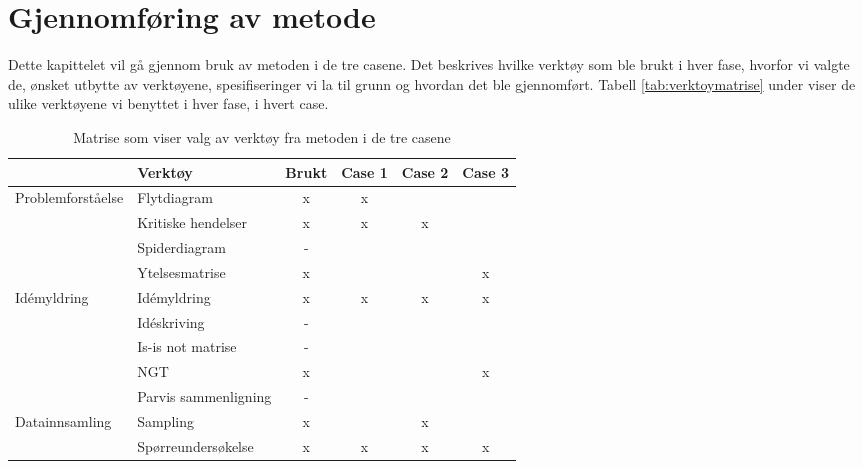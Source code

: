 \chapter{Gjennomføring av metode}
Dette kapittelet vil gå gjennom bruk av metoden i de tre casene. Det beskrives hvilke verktøy som ble brukt i hver fase, hvorfor vi valgte de, ønsket utbytte av verktøyene, spesifiseringer vi la til grunn og hvordan det ble gjennomført. Tabell \ref{tab:verktoymatrise} under viser de ulike verktøyene vi benyttet i hver fase, i hvert case. 
\begin{table}[htbp]
  \centering
    \caption[Matrise som viser valg av verktøy]{Matrise som viser valg av verktøy fra metoden i de tre casene}
    \begin{tabular}{|l|l|c|r|r|r|}
    \hline
         \cellcolor{yellow} & \cellcolor{yellow} Verktøy & \cellcolor{yellow} Brukt & \multicolumn{1}{c|}{\cellcolor{yellow} Case 1} & \multicolumn{1}{c|}{\cellcolor{yellow} Case 2} & \multicolumn{1}{c|}{\cellcolor{yellow} Case 3} \\
    \hline
    \multicolumn{1}{|l|}{\multirow{4}[8]{*}{Problemforståelse}} & Flytdiagram & x     & \multicolumn{1}{c|}{x} &       &  \\
\cline{2-6}          & Kritiske hendelser & x     & \multicolumn{1}{c|}{x} & \multicolumn{1}{c|}{x} &  \\
\cline{2-6}          & Spiderdiagram & -     &       &       &  \\
\cline{2-6}          & Ytelsesmatrise & x     &       &       & \multicolumn{1}{c|}{x} \\
    \hline
    \multicolumn{1}{|l|}{\multirow{5}[10]{*}{Idémyldring}} & Idémyldring & x     & \multicolumn{1}{c|}{x} & \multicolumn{1}{c|}{x} & \multicolumn{1}{c|}{x} \\
\cline{2-6}          & Idéskriving & -     &       &       &  \\
\cline{2-6}          & Is-is not matrise & -     &       &       &  \\
\cline{2-6}          & NGT   & x     &       &       & \multicolumn{1}{c|}{x} \\
\cline{2-6}          & Parvis sammenligning & -     &       &       &  \\
    \hline
    \multicolumn{1}{|l|}{\multirow{3}[6]{*}{Datainnsamling}} & Sampling & x     &    &  \multicolumn{1}{c|}{x}     &  \\
\cline{2-6}          & Spørreundersøkelse & x     & \multicolumn{1}{c|}{x} & \multicolumn{1}{c|}{x} & \multicolumn{1}{c|}{x} \\

\end{tabular}
\end{table}
